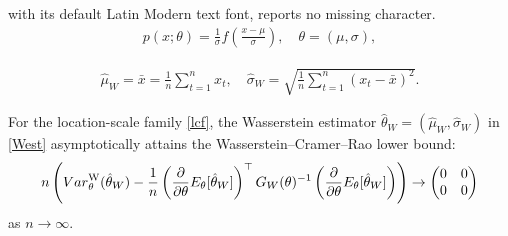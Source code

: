 \documentclass[10pt,a4paper]{amsart}
\begin{document}
with its default Latin Modern text font, reports no missing character.
\begin{align}\label{lcf}
	p(x; \theta) = \frac{1}{\sigma}f\left(\frac{x-\mu}{\sigma}\right), \quad \theta=(\mu,\sigma),
\end{align}

\begin{align}\label{West}
	\hat{\mu}_W = \bar{x} = \frac{1}{n}\sum_{t=1}^n x_t,\quad  \hat{\sigma}_W = \sqrt{\frac{1}{n}\sum_{t=1}^n (x_t-\bar{x})^2}.
\end{align}

\begin{theorem}\label{th: asymptotic efficiency}
	For the location-scale family \eqref{lcf}, the Wasserstein estimator $\hat{\theta}_W=(\hat{\mu}_W,\hat{\sigma}_W)$ in \eqref{West} asymptotically attains the Wasserstein--Cramer--Rao lower bound:
	\begin{align*}
		n \left( {\rm Var}_{\theta}^{\mathrm{W}}(\hat{\theta}_W) - \frac{1}{n} \left(\frac{\partial}{\partial \theta} {\rm E}_{\theta} [\hat{\theta}_W] \right)^\top G_W(\theta)^{-1} \left(\frac{\partial}{\partial \theta} {\rm E}_{\theta} [\hat{\theta}_W]\right) \right) \to \begin{pmatrix} 0 & 0 \\ 0 & 0 \end{pmatrix}
	\end{align*}
	as $n\to\infty$.
\end{theorem}
\end{document}
